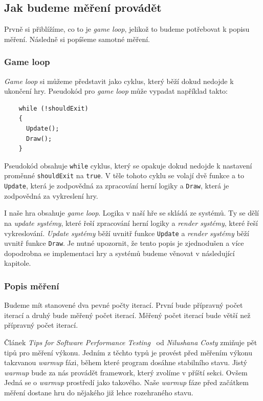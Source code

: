 \subsection{Jak budeme měření provádět}
Prvně si přiblížíme, co to je \textit{game loop}, jelikož to budeme potřebovat k popisu měření. Následně si popíšeme samotné měření.

\subsubsection{Game loop}
\label{game-loop}
\textit{Game loop} si můžeme představit jako cyklus, který běží dokud nedojde k ukončení hry. Pseudokód pro \textit{game loop} může vypadat například takto:

\begin{verbatim}
    while (!shouldExit) 
    {
      Update();
      Draw();
    }
\end{verbatim}

Pseudokód obsahuje \texttt{while} cyklus, který se opakuje dokud nedojde k nastavení proměnné \texttt{shouldExit} na \texttt{true}. V těle tohoto cyklu se volají dvě funkce a to \texttt{Update}, která je zodpovědná za zpracování herní logiky a \texttt{Draw}, která je zodpovědná za vykreslení hry. 

I naše hra obsahuje \textit{game loop}. Logika v naší hře se skládá ze systémů. Ty se dělí na \textit{update systémy}, které řeší zpracování herní logiky a \textit{render systémy}, které řeší vykreslování. \textit{Update systémy} běží uvnitř funkce \texttt{Update} a \textit{render systémy} běží uvnitř funkce \texttt{Draw}. Je nutné upozornit, že tento popis je zjednodušen a více dopodrobna se implementaci hry a systémů budeme věnovat v následující kapitole.

\subsubsection{Popis měření}
Budeme mít stanovené dva pevné počty iterací. První bude přípravný počet iterací a druhý bude měřený počet iterací. Měřený počet iterací bude větší než přípravný počet iterací.

Článek \textit{Tips for Software Performance Testing}~\cite{PerformanceTips} od \textit{Nilushana Costy} zmiňuje pět tipů pro měření výkonu. Jedním z těchto typů je provést před měřením výkonu takzvanou \textit{warmup} fázi, během které program dosáhne stabilního stavu. Jistý \textit{warmup} bude za nás provádět framework, který zvolíme v příští sekci. Ovšem Jedná se o \textit{warmup} prostředí jako takového. Naše \textit{warmup} fáze před začátkem měření dostane hru do nějakého již lehce rozehraného stavu.

